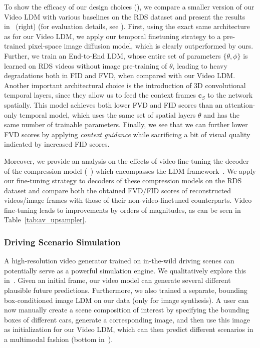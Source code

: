 To show the efficacy of our design choices (), we compare a smaller version of our Video LDM with various baselines on the RDS dataset and present the results in~ (right) (for evaluation details, see ). First, using the exact same architecture as for our Video LDM, we apply our temporal finetuning strategy to a pre-trained pixel-space image diffusion model, which is clearly outperformed by ours. Further, we train an End-to-End LDM, whose entire set of parameters $\{\theta, \phi\}$ is learned on RDS videos without image pre-training of $\theta$, leading to heavy degradations both in FID and FVD, when compared with our Video LDM. Another important architectural choice is the introduction of 3D convolutional temporal layers, since they allow us to feed the context frames $\boldsymbol{c}_{S}$ to the network spatially. This model achieves both lower FVD and FID scores than an attention-only temporal model, which uses the same set of spatial layers $\theta$ and has the same number of trainable parameters. Finally, we see that we can further lower FVD scores by applying \emph{context guidance} while sacrificing a bit of visual quality indicated by increased FID scores.

Moreover, we provide an analysis on the effects of video fine-tuning the decoder of the compression model (\cf~) which encompasses the LDM framework~\cite{rombach2021highresolution}. We apply our fine-tuning strategy to decoders of these compression models on the RDS
dataset and compare both the obtained FVD/FID scores of reconstructed videos/image frames with those of their non-video-finetuned counterparts. 
Video fine-tuning leads to improvements by orders of magnitudes, as can be seen in Table~\ref{tab:av_upsampler}.

\vspace{-2mm}
\subsubsection{Driving Scenario Simulation}\label{sec:driving_simulation}
\vspace{-1mm}
A high-resolution video generator trained on in-the-wild driving scenes can potentially serve as a powerful simulation engine. We qualitatively explore this in~. Given an initial frame, our video model can generate several different plausible future predictions. Furthermore, we also trained a separate, bounding box-conditioned image LDM on our data (only for image synthesis). A user can now manually create a scene composition of interest by specifying the bounding boxes of different cars, generate a corresponding image, and then use this image as initialization for our Video LDM, which can then predict different scenarios in a multimodal fashion (bottom in~). 


